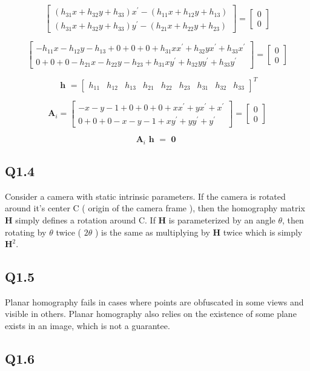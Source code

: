 \documentclass[12pt]{article}
\begin{document}
$$
\begin{bmatrix}
( h_{31} x + h_{32} y + h_{33} ) x^{ \prime } - ( h_{11} x + h_{12} y + h_{13} ) \\
( h_{31} x + h_{32} y + h_{33} ) y^{ \prime } - ( h_{21} x + h_{22} y + h_{23} )
\end{bmatrix}
=
\begin{bmatrix}
0 \\ 0
\end{bmatrix}
$$

$$
\begin{bmatrix}
- h_{11} x 
- h_{12} y 
- h_{13}
+ 0 + 0 + 0
+ h_{31} x  x^{ \prime }
+ h_{32} y  x^{ \prime }
+ h_{33} x^{ \prime }   \\
0 + 0 + 0
- h_{21} x 
- h_{22} y 
- h_{23}
+ h_{31} x y^{ \prime } 
+ h_{32} y y^{ \prime } 
+ h_{33}   y^{ \prime } 
\end{bmatrix}
=
\begin{bmatrix}
0 \\ 0
\end{bmatrix}
$$

$$
\textbf { h } = 
\begin{bmatrix}
h_{11} & h_{12} & h_{13} & h_{21} & h_{22} & h_{23} & h_{31} & h_{32} & h_{33} 
\end{bmatrix}^{T}
$$

$$
\textbf{A}_{i} = 
\begin{bmatrix}
- x 
- y 
- 1
+ 0 + 0 + 0
+ x  x^{ \prime }
+ y  x^{ \prime }
+ x^{ \prime }   \\
0 + 0 + 0
- x 
- y 
- 1
+ x y^{ \prime } 
+ y y^{ \prime } 
+   y^{ \prime } 
\end{bmatrix}
=
\begin{bmatrix}
0 \\ 0
\end{bmatrix}
$$

$$
\textbf{A}_{i} 
\textbf { h } =  \textbf { 0 }
$$


\subsection{Q1.4}
Consider a camera with static intrinsic parameters. If the camera is rotated around it's center C ( origin of the camera frame ), then the homography matrix $\textbf{H}$ simply defines a rotation around C. If  $\textbf{H}$ is parameterized by an angle $\theta$, then rotating by $\theta$ twice ( $2 \theta$ ) is the same as multiplying by $\textbf{H}$ twice which is simply $\textbf{H}^{2}$.

\subsection{Q1.5}
Planar homography fails in cases where points are obfuscated in some views and visible in others. Planar homography also relies on the existence of some plane exists in an image, which is not a guarantee.
\subsection{Q1.6}
\end{document}
